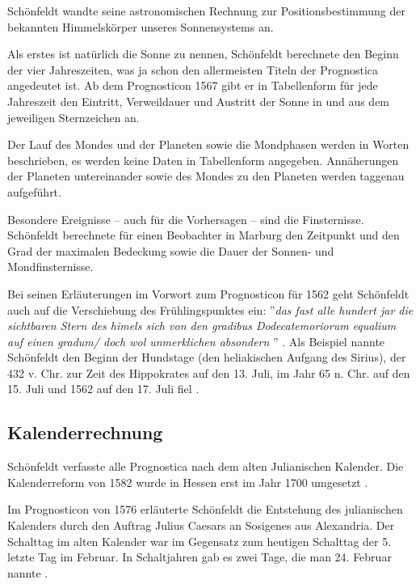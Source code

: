 \documentclass[12pt]{article}
\begin{document}
Schönfeldt wandte seine astronomischen Rechnung zur Positionsbestimmung der bekannten Himmelskörper unseres Sonnensystems an.

Als erstes ist natürlich die Sonne zu nennen, Schönfeldt berechnete den Beginn der vier Jahreszeiten, was ja schon den allermeisten Titeln der Prognostica angedeutet ist. Ab dem Prognosticon 1567 gibt er in Tabellenform für jede Jahreszeit den Eintritt, Verweildauer und Austritt der Sonne in und aus dem jeweiligen Sternzeichen an.

Der Lauf des Mondes und der Planeten sowie die Mondphasen werden in Worten beschrieben, es werden keine Daten in Tabellenform angegeben.
Annäherungen der Planeten untereinander sowie des Mondes zu den Planeten werden taggenau aufgeführt.

Besondere Ereignisse -- auch für die Vorhersagen -- sind die Finsternisse. Schönfeldt berechnete für einen Beobachter in Marburg den Zeitpunkt und den Grad der maximalen Bedeckung sowie die Dauer der Sonnen- und Mondfinsternisse. 

Bei seinen Erläuterungen im Vorwort zum Prognosticon für 1562 geht Schönfeldt auch auf die Verschiebung des Frühlingspunktes ein: ''\emph{das fast alle hundert jar die sichtbaren Stern des himels  sich von den gradibus Dodecatemoriorum equalium auf einen gradum/ doch wol unmerklichen absondern }'' \cite{Schoenfeldt1561}. Als Beispiel nannte Schönfeldt den Beginn der Hundstage (den heliakischen Aufgang des Sirius), der 432 v. Chr. zur Zeit des Hippokrates auf den 13. Juli, im Jahr 65 n. Chr. auf den 15. Juli und 1562 auf den 17. Juli fiel \cite{Schoenfeldt1561}.


\subsection{Kalenderrechnung}

Schönfeldt verfasste alle Prognostica nach dem alten Julianischen Kalender. Die Kalenderreform von 1582 wurde in Hessen erst im Jahr 1700 umgesetzt \cite{Hamel2002}.


Im Prognosticon von 1576 erläuterte Schönfeldt die Entstehung des julianischen Kalenders durch den Auftrag Julius Caesars an Sosigenes aus Alexandria. Der Schalttag im alten Kalender war im Gegensatz zum heutigen Schalttag der 5. letzte Tag im Februar. In Schaltjahren gab es zwei Tage, die man 24. Februar nannte \cite{Schoenfeldt1576}.
\end{document}

